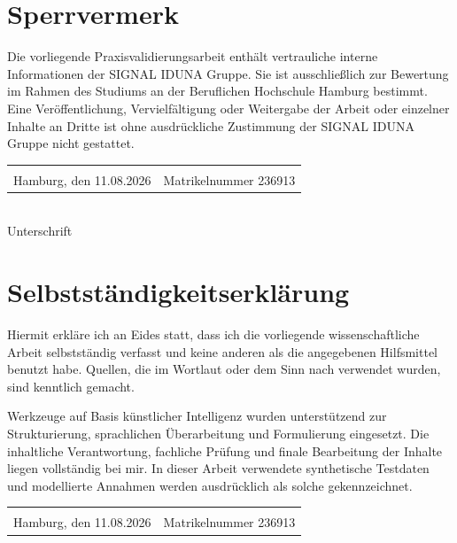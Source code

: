 \documentclass[
  10pt,
  ngerman,
  a4paper,
  toc=graduated,
  numbers=noenddot,
  headings=standardclasses,
  nonumberlist
]{scrartcl}
\begin{document}
\newpage
\hypersetup{pageanchor=true}
\tableofcontents

\newpage
\section*{Sperrvermerk}
Die vorliegende Praxisvalidierungsarbeit enthält vertrauliche interne Informationen der SIGNAL IDUNA Gruppe. Sie ist ausschließlich zur Bewertung im Rahmen des Studiums an der Beruflichen Hochschule Hamburg bestimmt. Eine Veröffentlichung, Vervielfältigung oder Weitergabe der Arbeit oder einzelner Inhalte an Dritte ist ohne ausdrückliche Zustimmung der SIGNAL IDUNA Gruppe nicht gestattet.

\vspace{2cm}
\begin{tabular}{@{}p{6cm}p{6cm}@{}}
\hrulefill & \hrulefill\\
Hamburg, den 11.08.2026 & Matrikelnummer 236913
\end{tabular}

\vspace{2cm}
\hrulefill\\
Unterschrift

\newpage
\section*{Selbstständigkeitserklärung}
Hiermit erkläre ich an Eides statt, dass ich die vorliegende wissenschaftliche Arbeit selbstständig verfasst und keine anderen als die angegebenen Hilfsmittel benutzt habe. Quellen, die im Wortlaut oder dem Sinn nach verwendet wurden, sind kenntlich gemacht.

Werkzeuge auf Basis künstlicher Intelligenz wurden unterstützend zur Strukturierung, sprachlichen Überarbeitung und Formulierung eingesetzt. Die inhaltliche Verantwortung, fachliche Prüfung und finale Bearbeitung der Inhalte liegen vollständig bei mir. In dieser Arbeit verwendete synthetische Testdaten und modellierte Annahmen werden ausdrücklich als solche gekennzeichnet.

\vspace{2cm}
\begin{tabular}{@{}p{6cm}p{6cm}@{}}
\hrulefill & \hrulefill\\
Hamburg, den 11.08.2026 & Matrikelnummer 236913
\end{tabular}
\end{document}
